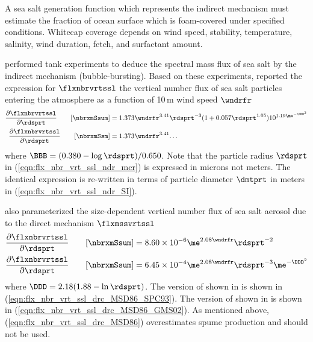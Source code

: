 \documentclass[12pt,twoside]{book}
\begin{document}
A sea salt generation function which represents the indirect mechanism
must estimate the fraction of ocean surface which is foam-covered
under specified conditions.  
Whitecap coverage depends on wind speed, stability, temperature,
salinity, wind duration, fetch, and surfactant amount.

\cite{MDS82} performed tank experiments to deduce the spectral
mass flux of sea salt by the indirect mechanism (bubble-bursting).
Based on these experiments, \cite{MSD86} reported the expression for
$\flxnbrvrtssl$ the vertical number flux of sea salt particles
entering the atmosphere as a function of 10\,m wind speed $\wndrfr$
\begin{subequations}
\label{eqn:flx_nbr_vrt_ssl_ndr_MSD86}
\begin{align}
\label{eqn:flx_nbr_vrt_ssl_ndr_mcr}
\frac{\partial \flxnbrvrtssl}{\partial \rdsprt} \qquad [\mbox{\nbrxmSsum}] & =  
1.373 \wndrfr^{3.41} \rdsprt^{-3} 
(1 + 0.057 \rdsprt^{1.05}) 10^{1.19 \me^{-\BBB^{2}}} \\
\label{eqn:flx_nbr_vrt_ssl_ndr_SI}
\frac{\partial \flxnbrvrtssl}{\partial \rdsprt} \qquad [\mbox{\nbrxmSsm}] & = 
1.373 \wndrfr^{3.41} \mbox{\ldots}
\end{align}
\end{subequations}
where $\BBB = (0.380 - \log \rdsprt)/0.650$.
Note that the particle radius $\rdsprt$ in
(\ref{eqn:flx_nbr_vrt_ssl_ndr_mcr}) is expressed in microns not
meters.  
The identical expression is re-written in terms of particle diameter
$\dmtprt$ in meters in (\ref{eqn:flx_nbr_vrt_ssl_ndr_SI}). 

\cite{MSD86} also parameterized the size-dependent vertical number flux
of sea salt aerosol due to the direct mechanism $\flxmssvrtssl$
\begin{subequations}
\label{eqn:flx_nbr_vrt_ssl_drc_MSD86}
\begin{align}
\label{eqn:flx_nbr_vrt_ssl_drc_MSD86_GMS02}
\frac{\partial \flxnbrvrtssl}{\partial \rdsprt} \qquad [\mbox{\nbrxmSsum}] & =
8.60 \times 10^{-6} \me^{2.08 \wndrfr} \rdsprt^{-2} \\
\label{eqn:flx_nbr_vrt_ssl_drc_MSD86_SPC93}
\frac{\partial \flxnbrvrtssl}{\partial \rdsprt} \qquad [\mbox{\nbrxmSsum}] & =
6.45 \times 10^{-4} \me^{2.08 \wndrfr} \rdsprt^{-3} \me^{-\DDD^{2}}
\end{align}
\end{subequations}
where $\DDD = 2.18 (1.88 - \ln \rdsprt)$.
The version of \cite{MSD86} shown in \cite{SPC93} is shown in
(\ref{eqn:flx_nbr_vrt_ssl_drc_MSD86_SPC93}). 
The version of \cite{MSD86} shown in \cite{GMS02} is shown in
(\ref{eqn:flx_nbr_vrt_ssl_drc_MSD86_GMS02}). 
As mentioned above, (\ref{eqn:flx_nbr_vrt_ssl_drc_MSD86})
overestimates spume production \cite[][]{And98} and should not be used.
\end{document}
